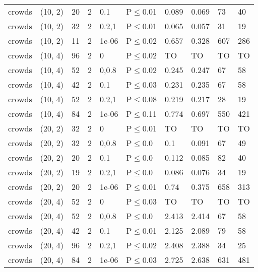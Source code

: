 \begin{longtable}{llrrllllll}
 crowds        & (10, 2)   &     	20 &    2 & 0.1   & P$\leq$0.01  & 0.089   & 0.069   & 73      & 40   \\
 crowds        & (10, 2)   &     	32 &    2 & 0.2,1 & P$\leq$0.01  & 0.065   & 0.057   & 31      & 19   \\
 crowds        & (10, 2)   &     	11 &    2 & 1e-06 & P$\leq$0.02  & 0.657   & 0.328   & 607     & 286  \\
 crowds        & (10, 4)   &     	96 &    2 & 0     & P$\leq$0.02  & TO      & TO      & TO      & TO   \\
 crowds        & (10, 4)   &     	52 &    2 & 0,0.8 & P$\leq$0.02  & 0.245   & 0.247   & 67      & 58   \\
 crowds        & (10, 4)   &     	42 &    2 & 0.1   & P$\leq$0.03  & 0.231   & 0.235   & 67      & 58   \\
 crowds        & (10, 4)   &     	52 &    2 & 0.2,1 & P$\leq$0.08  & 0.219   & 0.217   & 28      & 19   \\
 crowds        & (10, 4)   &     	84 &    2 & 1e-06 & P$\leq$0.11  & 0.774   & 0.697   & 550     & 421  \\
 crowds        & (20, 2)   &     	32 &    2 & 0     & P$\leq$0.01  & TO      & TO      & TO      & TO   \\
 crowds        & (20, 2)   &     	32 &    2 & 0,0.8 & P$\leq$0.0   & 0.1     & 0.091   & 67      & 49   \\
 crowds        & (20, 2)   &     	20 &    2 & 0.1   & P$\leq$0.0   & 0.112   & 0.085   & 82      & 40   \\
 crowds        & (20, 2)   &     	19 &    2 & 0.2,1 & P$\leq$0.0   & 0.086   & 0.076   & 34      & 19   \\
 crowds        & (20, 2)   &     	20 &    2 & 1e-06 & P$\leq$0.01  & 0.74    & 0.375   & 658     & 313  \\
 crowds        & (20, 4)   &     	52 &    2 & 0     & P$\leq$0.03  & TO      & TO      & TO      & TO   \\
 crowds        & (20, 4)   &     	52 &    2 & 0,0.8 & P$\leq$0.0   & 2.413   & 2.414   & 67      & 58   \\
 crowds        & (20, 4)   &     	42 &    2 & 0.1   & P$\leq$0.01  & 2.125   & 2.089   & 79      & 58   \\
 crowds        & (20, 4)   &     	96 &    2 & 0.2,1 & P$\leq$0.02  & 2.408   & 2.388   & 34      & 25   \\
 crowds        & (20, 4)   &     	84 &    2 & 1e-06 & P$\leq$0.03  & 2.725   & 2.638   & 631     & 481  \\

\end{longtable}
